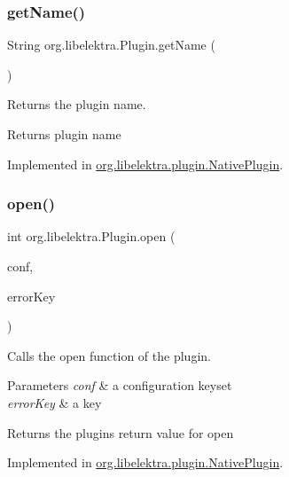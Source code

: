 \subsubsection{\texorpdfstring{getName()}{getName()}}
{\footnotesize\ttfamily String org.\+libelektra.\+Plugin.\+get\+Name (\begin{DoxyParamCaption}{ }\end{DoxyParamCaption})}



Returns the plugin name. 

\begin{DoxyReturn}{Returns}
plugin name 
\end{DoxyReturn}


Implemented in \mbox{\hyperlink{classorg_1_1libelektra_1_1plugin_1_1NativePlugin_a606fc8f54bc810d874176103859976ab}{org.\+libelektra.\+plugin.\+Native\+Plugin}}.

\mbox{\label{interfaceorg_1_1libelektra_1_1Plugin_a740f0602ea62e7a28c86fc801add8907}} 
\subsubsection{\texorpdfstring{open()}{open()}}
{\footnotesize\ttfamily int org.\+libelektra.\+Plugin.\+open (\begin{DoxyParamCaption}\item[{\mbox{\hyperlink{classorg_1_1libelektra_1_1KeySet}{Key\+Set}}}]{conf,  }\item[{\mbox{\hyperlink{classorg_1_1libelektra_1_1Key}{Key}}}]{error\+Key }\end{DoxyParamCaption})}



Calls the open function of the plugin. 


\begin{DoxyParams}{Parameters}
{\em conf} & a configuration keyset \\
\hline
{\em error\+Key} & a key \\
\hline
\end{DoxyParams}
\begin{DoxyReturn}{Returns}
the plugin\textquotesingle{}s return value for open 
\end{DoxyReturn}


Implemented in \mbox{\hyperlink{classorg_1_1libelektra_1_1plugin_1_1NativePlugin_a81510de92e0d65784e877bf53b89756a}{org.\+libelektra.\+plugin.\+Native\+Plugin}}.

